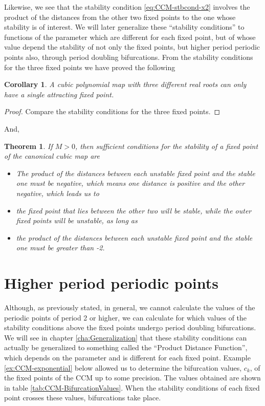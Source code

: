 \documentclass[10pt,twoside,titlepage]{book}
\numberwithin{equation}{chapter}
\numberwithin{figure}{chapter}
\numberwithin{table}{chapter}
\theoremstyle{plain}%
\newtheorem{thm}{Theorem}[chapter]
\newtheorem*{cor}{Corollary}
\theoremstyle{definition}
\theoremstyle{remark}
\begin{document}
Likewise, we see that the stability condition \eqref{eq:CCM-stbcond-x2} involves the product of the distances from the other two fixed points to the one whose stability is of interest. We will later generalize these ``stability conditions'' to functions of the parameter which are different for each fixed point, but of whose value depend the stability of not only the fixed points, but higher period periodic points also, through period doubling bifurcations. From the stability conditions for the three fixed points we have proved the following

\begin{cor}
	A cubic polynomial map with three different real roots can only have a single attracting fixed point.
\end{cor}
\begin{proof}
	Compare the stability conditions for the three fixed points.
\end{proof}

And,

\begin{thm}
	If $M>0$, then sufficient conditions for the stability of a fixed point of the canonical cubic map are
	\begin{itemize}
		\item The product of the distances between each unstable fixed point and the stable one must be negative, which means one distance is positive and the other negative, which leads us to
		\item the fixed point that lies between the other two will be stable, while the outer fixed points will be unstable, as long as
		\item the product of the distances between each unstable fixed point and the stable one must be greater than -2.
	\end{itemize}
\end{thm}

\section{Higher period periodic points}

Although, as previously stated, in general, we cannot calculate the values of the periodic points of period 2 or higher, we can calculate for which values of the stability conditions above the fixed points undergo period doubling bifurcations. We will see in chapter \ref{cha:Generalization} that these stability conditions can actually be generalized to something called the ``Product Distance Function'', which depends on the parameter and is different for each fixed point. Example \ref{ex:CCM-exponential} below allowed us to determine the bifurcation values, $c_k$, of the fixed points of the CCM up to some precision. The values obtained are shown in table \ref{tab:CCM-BifurcationValues}. When the stability conditions of each fixed point crosses these values, bifurcations take place.
\end{document}
